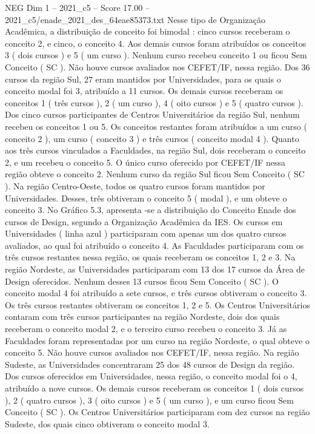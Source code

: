 \begin{textsample}{NEG Dim 1 – 2021\_c5 – Score 17.00 – 2021\_c5/enade\_2021\_des\_64eae85373.txt}
Nesse tipo de Organização Acadêmica, a distribuição de conceito foi bimodal : cinco cursos receberam o conceito 2, e cinco, o conceito 4.
Aos demais cursos foram atribuídos os conceitos 3 ( dois cursos ) e 5 ( um curso ).
Nenhum curso recebeu conceito 1 ou ficou Sem Conceito ( SC ).
Não houve cursos avaliados nos CEFET/IF, nessa região.
Dos 36 cursos da região Sul, 27 eram mantidos por Universidades, para os quais o conceito modal foi 3, atribuído a 11 cursos.
Os demais cursos receberam os conceitos 1 ( três cursos ), 2 ( um curso ), 4 ( oito cursos ) e 5 ( quatro cursos ).
Dos cinco cursos participantes de Centros Universitários da região Sul, nenhum recebeu os conceitos 1 ou 5.
Os conceitos restantes foram atribuídos a um curso ( conceito 2 ), um curso ( conceito 3 ) e três cursos ( conceito modal 4 ).
Quanto aos três cursos vinculados a Faculdades, na região Sul, dois receberam o conceito 2, e um recebeu o conceito 5.
O único curso oferecido por CEFET/IF nessa região obteve o conceito 2.
Nenhum curso da região Sul ficou Sem Conceito ( SC ).
Na região Centro-Oeste, todos os quatro cursos foram mantidos por Universidades.
Desses, três obtiveram o conceito 5 ( modal ), e um obteve o conceito 3.
No Gráfico 5.3, apresenta -se a distribuição do Conceito Enade dos cursos de Design, segundo a Organização Acadêmica da IES.
Os cursos em Universidades ( linha azul ) participaram com apenas um dos quatro cursos avaliados, ao qual foi atribuído o conceito 4.
As Faculdades participaram com os três cursos restantes nessa região, os quais receberam os conceitos 1, 2 e 3.
Na região Nordeste, as Universidades participaram com 13 dos 17 cursos da Área de Design oferecidos.
Nenhum desses 13 cursos ficou Sem Conceito ( SC ).
O conceito modal 4 foi atribuído a sete cursos, e três cursos obtiveram o conceito 3.
Os três cursos restantes obtiveram os conceitos 1, 2 e 5.
Os Centros Universitários contaram com três cursos participantes na região Nordeste, dois dos quais receberam o conceito modal 2, e o terceiro curso recebeu o conceito 3.
Já as Faculdades foram representadas por um curso na região Nordeste, o qual obteve o conceito 5.
Não houve cursos avaliados nos CEFET/IF, nessa região.
Na região Sudeste, as Universidades concentraram 25 dos 48 cursos de Design da região.
Dos cursos oferecidos em Universidades, nessa região, o conceito modal foi o 4, atribuído a nove cursos.
Os demais cursos receberam os conceitos 1 ( dois cursos ), 2 ( quatro cursos ), 3 ( oito cursos ) e 5 ( um curso ), e um curso ficou Sem Conceito ( SC ).
Os Centros Universitários participaram com dez cursos na região Sudeste, dos quais cinco obtiveram o conceito modal 3.

\end{textsample}
